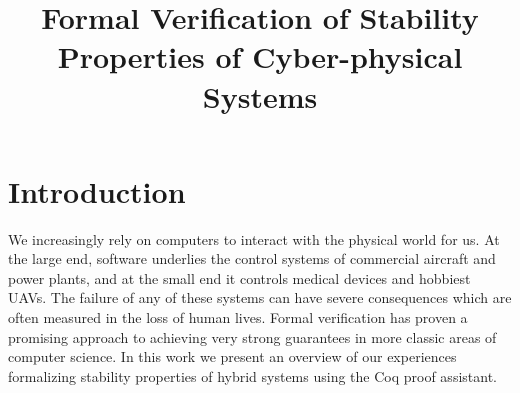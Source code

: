 \documentclass[preprint,nocopyrightspace]{sigplanconf}
\begin{document}
\setlength{\pdfpageheight}{\paperheight}
\setlength{\pdfpagewidth}{\paperwidth}





\titlebanner{}        %
\preprintfooter{}   %

\title{Formal Verification of Stability Properties of Cyber-physical Systems}

\authorinfo{}
           {}
           {}
\authorinfo{}
           {}
           {}

\maketitle





\section{Introduction}          %

We increasingly rely on computers to interact with the physical world for us.
At the large end, software underlies the control systems of commercial aircraft and power plants, and at the small end it controls medical devices and hobbiest UAVs.
The failure of any of these systems can have severe consequences which are often measured in the loss of human lives.
Formal verification has proven a promising approach to achieving very strong guarantees in more classic areas of computer science.
In this work we present an overview of our experiences formalizing stability properties of hybrid systems using the Coq proof assistant.
\end{document}
